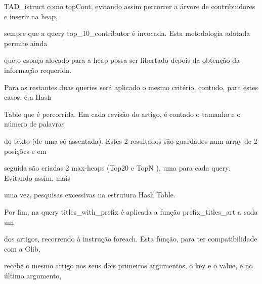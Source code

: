\documentclass[a4paper,portrait,12pt]{article}
\begin{document}
\begin{flushleft}
TAD\_istruct como topCont, evitando assim percorrer a árvore de contribuidores e inserir na heap,
\end{flushleft}


\begin{flushleft}
sempre que a query top\_10\_contributor é invocada. Esta metodologia adotada permite ainda
\end{flushleft}


\begin{flushleft}
que o espaço alocado para a heap possa ser libertado depois da obtenção da informação requerida.
\end{flushleft}


\begin{flushleft}
Para as restantes duas queries será aplicado o mesmo critério, contudo, para estes casos, é a Hash
\end{flushleft}


\begin{flushleft}
Table que é percorrida. Em cada revisão do artigo, é contado o tamanho e o número de palavras
\end{flushleft}


\begin{flushleft}
do texto (de uma só assentada). Estes 2 resultados são guardados num array de 2 posições e em
\end{flushleft}


\begin{flushleft}
seguida são criadas 2 max-heaps (Top20 e TopN ), uma para cada query. Evitando assim, mais
\end{flushleft}


\begin{flushleft}
uma vez, pesquisas excessivas na estrutura Hash Table.
\end{flushleft}


\begin{flushleft}
Por fim, na query titles\_with\_prefix é aplicada a função prefix\_titles\_art a cada um
\end{flushleft}


\begin{flushleft}
dos artigos, recorrendo à instrução foreach. Esta função, para ter compatibilidade com a Glib,
\end{flushleft}


\begin{flushleft}
recebe o mesmo artigo nos seus dois primeiros argumentos, o key e o value, e no último argumento,
\end{flushleft}
\end{document}
